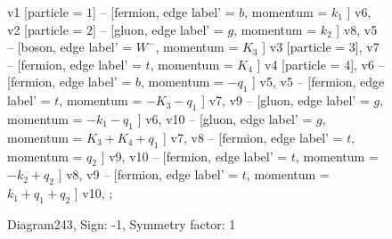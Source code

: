 \documentclass{revtex4}
\begin{document}
\begin{figure}[!htb]
\begin{center}
{    %
v1 [particle = \(1\)] -- [fermion, edge label' = \(b\), momentum = \(k_{1}\) ] v6, 
v2 [particle = \(2\)] -- [gluon, edge label' = \(g\), momentum = \(k_{2}\) ] v8, 
v5 -- [boson, edge label' = \(W^{-}\), momentum = \(K_{3}\) ] v3 [particle = \(3\)], 
v7 -- [fermion, edge label' = \(t\), momentum = \(K_{4}\) ] v4 [particle = \(4\)], 
v6 -- [fermion, edge label' = \(b\), momentum = \(-q_{1}\) ] v5, 
v5 -- [fermion, edge label' = \(t\), momentum = \(-K_{3} - q_{1}\) ] v7, 
v9 -- [gluon, edge label' = \(g\), momentum = \(-k_{1} - q_{1}\) ] v6, 
v10 -- [gluon, edge label' = \(g\), momentum = \(K_{3} + K_{4} + q_{1}\) ] v7, 
v8 -- [fermion, edge label' = \(t\), momentum = \(q_{2}\) ] v9, 
v10 -- [fermion, edge label' = \(t\), momentum = \(-k_{2} + q_{2}\) ] v8, 
v9 -- [fermion, edge label' = \(t\), momentum = \(k_{1} + q_{1} + q_{2}\) ] v10, 
};
\end{center}
\caption{Diagram243, Sign: -1, Symmetry factor: 1}
\end{figure}
\newpage
\end{document}
